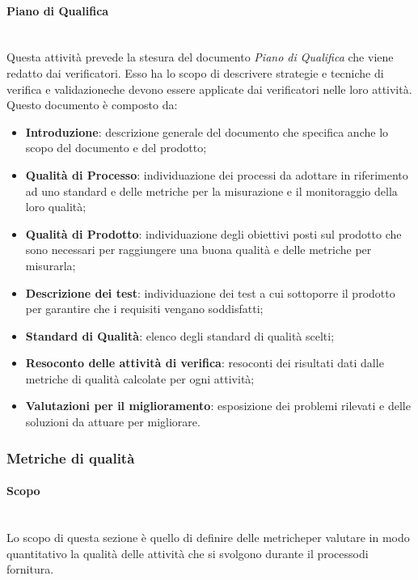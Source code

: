 \paragraph{Piano di Qualifica}\mbox{}\\ [1mm]
Questa attività prevede la stesura del documento \textit{Piano di Qualifica} che viene redatto dai verificatori. Esso ha lo scopo di descrivere strategie e tecniche di verifica e validazione\glosp che devono essere applicate dai verificatori nelle loro attività.
Questo documento è composto da:
\begin{itemize}
	\item \textbf{Introduzione}: descrizione generale del documento che specifica anche lo scopo del documento e del prodotto;
	\item \textbf{Qualità di Processo}: individuazione dei processi da adottare in riferimento ad uno standard e delle metriche per la misurazione e il monitoraggio della loro qualità;
	\item \textbf{Qualità di Prodotto}: individuazione degli obiettivi posti sul prodotto che sono necessari per raggiungere una buona qualità e delle metriche per misurarla;
	\item \textbf{Descrizione dei test}: individuazione dei test a cui sottoporre il prodotto per garantire che i requisiti vengano soddisfatti;
	\item \textbf{Standard di Qualità}: elenco degli standard di qualità scelti;
	\item \textbf{Resoconto delle attività di verifica}: resoconti dei risultati dati dalle metriche di qualità calcolate per ogni attività;
	\item \textbf{Valutazioni per il miglioramento}: esposizione dei problemi rilevati e delle soluzioni da attuare per migliorare.
\end{itemize}
\subsubsection{Metriche di qualità}
\paragraph*{Scopo}\mbox{}\\ [1mm]
Lo scopo di questa sezione è quello di definire delle metriche\glosp per valutare in modo quantitativo la qualità delle attività che si svolgono durante il processo\glosp di fornitura.
